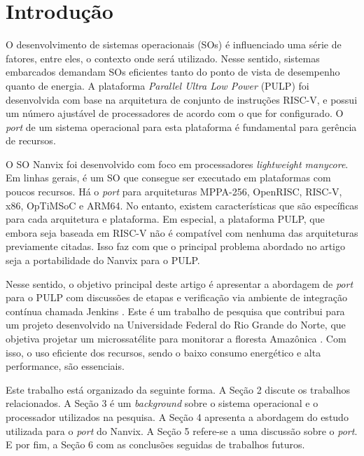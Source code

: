 \section{Introdução}

O desenvolvimento de sistemas operacionais (SOs) é influenciado uma série de fatores, entre eles, o contexto onde será utilizado. Nesse sentido, sistemas
embarcados demandam SOs eficientes tanto do ponto de vista de desempenho quanto de energia. A plataforma \textit{Parallel Ultra Low Power} (PULP) \cite{PulpSDKRepositorio} foi desenvolvida com base na arquitetura de conjunto de instruções RISC-V, e possui um número ajustável de processadores de acordo com o que for configurado. O \textit{port} de um sistema operacional para esta plataforma é fundamental para gerência de recursos.

O SO Nanvix foi desenvolvido com foco em processadores \textit{lightweight manycore}. Em linhas gerais, é um SO que consegue ser executado em plataformas com poucos
recursos. Há o \textit{port} para arquiteturas MPPA-256, OpenRISC, RISC-V, x86, OpTiMSoC e ARM64. No entanto, existem características que são específicas para cada 
arquitetura e plataforma. Em especial, a plataforma PULP, que embora seja baseada em RISC-V não é compatível com nenhuma das arquiteturas previamente citadas. 
Isso faz com que o principal problema abordado no artigo seja a portabilidade do Nanvix para o PULP.

Nesse sentido, o objetivo principal deste artigo é apresentar a abordagem de \textit{port} para o PULP com discussões de etapas e verificação via ambiente de integração contínua chamada Jenkins \cite{JenkinsServer}. Este é um trabalho de pesquisa que contribui para um projeto desenvolvido na Universidade Federal do Rio Grande do Norte, que objetiva projetar  um microssatélite para monitorar a floresta Amazônica \cite{RepoCervero}. Com isso, o uso eficiente dos recursos, sendo o baixo consumo energético e alta performance, são essenciais.

Este trabalho está organizado da seguinte forma. A Seção 2 discute os trabalhos relacionados. A Seção 3 é um \textit{background} sobre o sistema operacional e o 
processador utilizados na pesquisa. A Seção 4 apresenta a abordagem do estudo utilizada para o \textit{port} do Nanvix. A Seção 5 refere-se a uma discussão sobre 
o \textit{port}. E por fim, a Seção 6 com as conclusões seguidas de trabalhos futuros.
